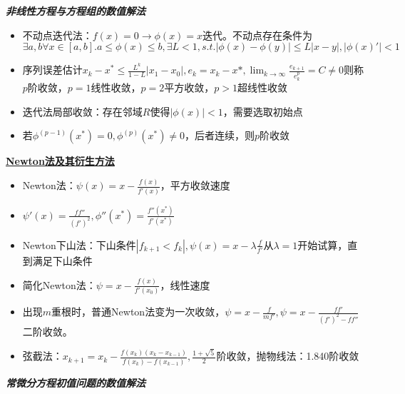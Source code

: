 \documentclass[UTF8,a4paper,landscape,compress]{paper}
\renewcommand{\subsection}[1]{{\small\textbf{\underline{#1}}}\\ }
\renewcommand{\section}[1]{{\normalsize\textbf{\emph{#1}}}\\ }
\newcommand{\List}[1]{\begin{itemize}[fullwidth,itemindent=0em] #1 \end{itemize}}
\begin{document}
\begin{multicols}{4}
\section{非线性方程与方程组的数值解法}
    \List{
        \item {不动点迭代法：$f(x) = 0 \rightarrow \phi(x) = x$迭代。不动点存在条件为$\exists a,b\forall x \in [a,b]. a \le \phi(x) \le b, \exists L < 1, s.t. |\phi(x)-\phi(y)| \le L|x-y|, |\phi(x)'| < 1$}
        \item {序列误差估计$x_k-x^* \le \frac {L^k}{1-L}|x_1-x_0|, e_k = x_k - x*, \lim_{k\to\infty} \frac{e_{k+1}}{e_k^p} = C \ne 0$则称$p$阶收敛，$p = 1$线性收敛，$p = 2$平方收敛，$p>1$超线性收敛}
        \item {迭代法局部收敛：存在邻域$R$使得$|\phi(x)| < 1$，需要选取初始点}
        \item {若$\phi^{(p-1)}(x^*) = 0,\phi^{(p)}(x^*) \ne 0$，后者连续，则$p$阶收敛}
    }
    \subsection{Newton法及其衍生方法}
    \List{
        \item {Newton法：$\psi(x) =x - \frac{f(x)}{f'(x)}$，平方收敛速度}
        \item {$\psi'(x) = \frac{ff''}{(f')^2},\phi''(x^*) = \frac{f''(x^*)}{f'(x^*)}$}
        \item {Newton下山法：下山条件$|f_{k+1} < f_k|, \psi(x) = x-\lambda \frac f{f'}$从$\lambda=1$开始试算，直到满足下山条件}
        \item {简化Newton法：$\psi = x - \frac{f(x)}{f'(x_0)}$，线性速度}
        \item {出现$m$重根时，普通Newton法变为一次收敛，$\psi = x -\frac f {mf'},\psi = x - \frac{ff'}{(f')^2 - ff''}$二阶收敛。}
        \item {弦截法：$x_{k+1} = x_k -\frac{f(x_k)(x_k - x_{k-1})}{f(x_k) - f(x_{k-1})},\frac{1+\sqrt 5}2$阶收敛，抛物线法：1.840阶收敛}
    }
\section{常微分方程初值问题的数值解法}

\end{multicols}
\end{document}
